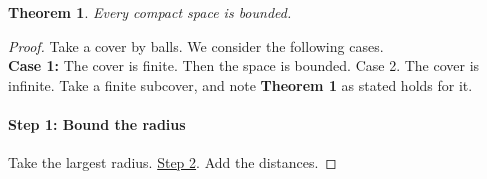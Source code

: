 \documentclass{article}
\newtheorem{theorem}{Theorem}
\begin{document}
\begin{theorem}
Every compact space is bounded.
\end{theorem}
\begin{proof}
Take a cover by balls. We consider the following cases.\\
{\bf Case 1:} The cover is finite. Then the space is bounded.
\textsf{Case 2.} The cover is infinite. Take a finite subcover, and note
\textbf{Theorem 1} as stated holds for it.
\paragraph{Step 1: Bound the radius} Take the largest radius.
\ul{Step 2}. Add the distances.
\end{proof}
\end{document}
